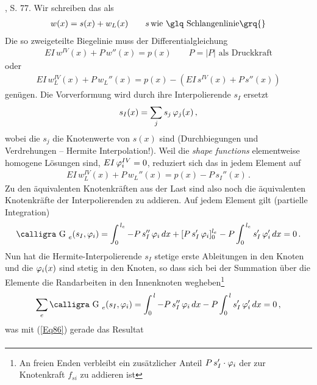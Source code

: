 {{{{{{ , \cite{Rubin} S. 77. Wir schreiben das als
\begin{align}
w(x) = s(x) + w_{L}(x) \qquad s\,\text{wie \glq Schlangenlinie\grq{}}
\end{align}
 Die so zweigeteilte Biegelinie muss der Differentialgleichung
\begin{align}
EI\,w^{IV}(x) + P\,w''(x) = p(x) \qquad  P = |P| \,\,\text{als Druckkraft}
\end{align}
oder
\begin{align}
EI\,w_{L}^{IV}(x) + P\,w_{L}''(x) = p(x) - (EI\,s^{IV}(x) + P\,s''(x))
\end{align}
gen\"{u}gen. Die Vorverformung wird durch ihre Interpolierende $s_I$ ersetzt
\begin{align}\label{Eq86}
s_I(x) = \sum_j s_j\,\varphi_j(x)\,,
\end{align}
wobei die $s_j$ die Knotenwerte von $s(x)$ sind (Durchbiegungen und Verdre\-hungen -- Hermite Interpolation!). Weil die {\em shape functions\/} elementweise homogene L\"{o}sungen sind, $EI\,\varphi_i^{IV} = 0$, reduziert sich das in jedem Element auf
\begin{align}
EI\,w_{L}^{IV}(x) + P\,w_{L}''(x) = p(x) - P\,s_{I}''(x)\,.
\end{align}
Zu den \"{a}quivalenten Knotenkr\"{a}ften aus der Last sind also noch die \"{a}quivalenten Knotenkr\"{a}fte der Interpolierenden zu addieren. Auf jedem Element gilt (partielle Integration)
\begin{align}
\text{\normalfont\calligra G\,\,}_e(s_I,\Np_i) = \int_0^{\,l_e} -P\,s_I''\,\Np_i\,dx + [P\,s_I'\,\Np_i]_0^{l_e} - P \int_0^{\,l_e} s_I'\,\Np_i'\,dx = 0\,.
\end{align}
Nun hat die Hermite-Interpolierende $s_I$ stetige erste Ableitungen in den Knoten und die $\varphi_i(x)$ sind stetig in den Knoten, so dass sich bei der Summation \"{u}ber die Elemente
die Randarbeiten in den Innenknoten wegheben\footnote{An freien Enden verbleibt ein zus\"{a}tzlicher Anteil $P\,s_I' \cdot \varphi_i$ der zur Knotenkraft $f_{si}$ zu addieren ist}
\begin{align}
\sum_e \text{\normalfont\calligra G\,\,}_e(s_I,\Np_i) = \int_0^{\,l} -P\,s_I''\,\Np_i\,dx  - P \int_0^{\,l} s_I'\,\Np_i'\,dx = 0\,,
\end{align}
was mit (\ref{Eq86}) gerade das Resultat
\begin{align}

\end{align}}}}}}}
